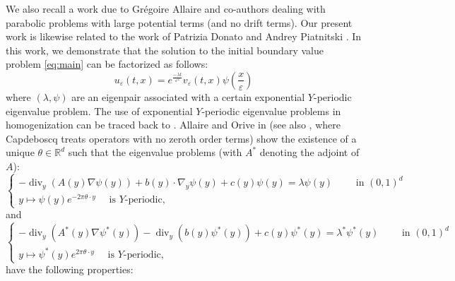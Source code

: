 \documentclass[preprint, 12pt]{amsart}
\numberwithin{equation}{section}
\numberwithin{equation}{section}
\DeclareMathOperator{\dv}{div}
\begin{document}
We also recall a work due to Gr\'egoire Allaire and co-authors \cite{allaire2004homogenization} dealing with parabolic problems with large potential terms (and no drift terms). Our present work is likewise related to the work of Patrizia Donato and Andrey Piatnitski \cite{donato2005averaging}. In this work, we demonstrate that the solution to the initial boundary value problem \eqref{eq:main} can be factorized as follows:
\begin{equation}\label{eq:factorization}
u_{\varepsilon}(t,x)=e^{\frac{-\lambda t}{\varepsilon^2}} v_{\varepsilon}(t,x)\psi\left(\frac{x}{\varepsilon}\right)
\end{equation}
where $(\lambda,\psi)$ are an eigenpair associated with a certain exponential $Y$-periodic eigenvalue problem. The use of exponential $Y$-periodic eigenvalue problems in homogenization can be traced back to \cite[page 383]{bensoussan2011asymptotic}. Allaire and Orive in \cite[Lemma 2.1]{allaire2007homogenization} (see also \cite[Lemma 3]{capdeboscq1998homogenization}, where Capdeboscq treats operators with no zeroth order terms) show the existence of a unique $\theta\in\mathbb{R}^d$ such that the eigenvalue problems (with $A^\ast$ denoting the adjoint of $A$):
\begin{equation}\label{eq:theta-direct-evp}
\left\{
\begin{aligned}
-\dv_y ({A}(y)\nabla \psi(y)) + b(y)\cdot\nabla_y\psi(y) + c(y) \psi(y) = \lambda \psi(y) \qquad \mbox{ in }(0,1)^d\\
y \mapsto \psi(y)e^{-2\pi \theta \cdot y}  \quad \mbox{ is }Y\mbox{-periodic},
\end{aligned}
\right.
\end{equation}
and
\begin{equation}\label{eq:theta-adjoint-evp}
\left\{
\begin{aligned}
-\dv_y ({A}^\ast(y)\nabla \psi^\ast(y)) - \dv_y(b(y)\psi^\ast(y)) + c(y) \psi^\ast(y) = \lambda^\ast \psi^\ast(y) \qquad \mbox{ in } (0,1)^d\\
y \mapsto \psi^\ast(y)e^{2\pi \theta \cdot y} \quad \mbox{ is }Y\mbox{-periodic},  
\end{aligned}
\right.
\end{equation}
have the following properties:
\end{document}
